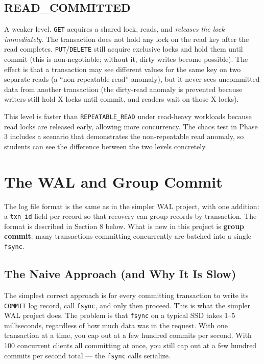 \documentclass[11pt,a4paper]{article}
\begin{document}
\subsection{READ\_COMMITTED}
A weaker level. \texttt{GET} acquires a shared lock, reads, and \textit{releases the lock immediately}. The transaction does not hold any lock on the read key after the read completes. \texttt{PUT}/\texttt{DELETE} still acquire exclusive locks and hold them until commit (this is non-negotiable; without it, dirty writes become possible). The effect is that a transaction may see different values for the same key on two separate reads (a ``non-repeatable read'' anomaly), but it never sees uncommitted data from another transaction (the dirty-read anomaly is prevented because writers still hold X locks until commit, and readers wait on those X locks).

This level is faster than \texttt{REPEATABLE\_READ} under read-heavy workloads because read locks are released early, allowing more concurrency. The chaos test in Phase 3 includes a scenario that demonstrates the non-repeatable read anomaly, so students can see the difference between the two levels concretely.

\section{The WAL and Group Commit}

The log file format is the same as in the simpler WAL project, with one addition: a \texttt{txn\_id} field per record so that recovery can group records by transaction. The format is described in Section 8 below. What is new in this project is \textbf{group commit}: many transactions committing concurrently are batched into a single \texttt{fsync}.

\subsection{The Naive Approach (and Why It Is Slow)}
The simplest correct approach is for every committing transaction to write its \texttt{COMMIT} log record, call \texttt{fsync}, and only then proceed. This is what the simpler WAL project does. The problem is that \texttt{fsync} on a typical SSD takes 1--5 milliseconds, regardless of how much data was in the request. With one transaction at a time, you cap out at a few hundred commits per second. With 100 concurrent clients all committing at once, you still cap out at a few hundred commits per second total --- the \texttt{fsync} calls serialize.
\end{document}

